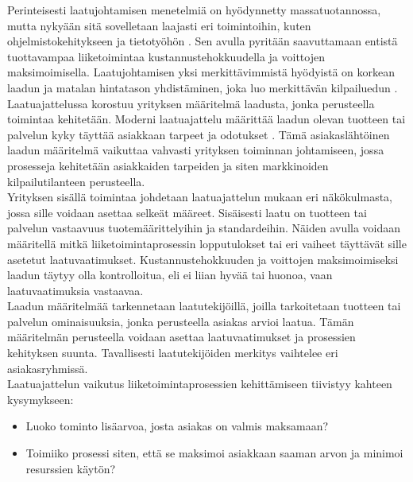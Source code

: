 \documentclass[finnish,12pt,a4paper,pdftex]{article}
\begin{document}
\noindent Perinteisesti laatujohtamisen menetelmiä on hyödynnetty massatuotannossa, mutta nykyään sitä sovelletaan laajasti eri toimintoihin, kuten ohjelmistokehitykseen ja tietotyöhön \citep{ohjelmistotuotanto}. Sen avulla pyritään saavuttamaan entistä tuottavampaa liiketoimintaa kustannustehokkuudella ja voittojen maksimoimisella. Laatujohtamisen yksi merkittävimmistä hyödyistä on korkean laadun ja matalan hintatason yhdistäminen, joka luo merkittävän kilpailuedun \citep{teollisuustalous}.\\

Laatuajattelussa korostuu yrityksen määritelmä laadusta, jonka perusteella toimintaa kehitetään. Moderni laatuajattelu määrittää laadun olevan tuotteen tai palvelun kyky täyttää asiakkaan tarpeet ja odotukset \citep{teollisuustalous}. Tämä asiakaslähtöinen laadun määritelmä vaikuttaa vahvasti yrityksen toiminnan johtamiseen, jossa prosesseja kehitetään asiakkaiden tarpeiden ja siten markkinoiden kilpailutilanteen perusteella. \\

\noindent Yrityksen sisällä toimintaa johdetaan laatuajattelun mukaan eri näkökulmasta, jossa sille voidaan asettaa selkeät määreet. Sisäisesti laatu on tuotteen tai palvelun vastaavuus tuotemäärittelyihin ja standardeihin. Näiden avulla voidaan määritellä mitkä liiketoimintaprosessin lopputulokset tai eri vaiheet täyttävät sille asetetut laatuvaatimukset. Kustannustehokkuuden ja voittojen maksimoimiseksi laadun täytyy olla kontrolloitua, eli ei liian hyvää tai huonoa, vaan laatuvaatimuksia vastaavaa. \citep{teollisuustalous}\\

\noindent Laadun määritelmää tarkennetaan laatutekijöillä, joilla tarkoitetaan tuotteen tai palvelun ominaisuuksia, jonka perusteella asiakas arvioi laatua. Tämän määritelmän perusteella voidaan asettaa laatuvaatimukset ja prosessien kehityksen suunta. Tavallisesti laatutekijöiden merkitys vaihtelee eri asiakasryhmissä. \citep{teollisuustalous}\\

\noindent Laatuajattelun vaikutus liiketoimintaprosessien kehittämiseen tiivistyy kahteen kysymykseen:
\begin{itemize}
\setlength{\itemsep}{0pt}
    \item Luoko tominto lisäarvoa, josta asiakas on valmis maksamaan?
    \item Toimiiko prosessi siten, että se maksimoi asiakkaan saaman arvon ja minimoi resurssien käytön?
\end{itemize}
\end{document}
